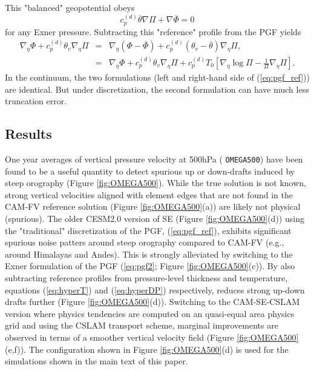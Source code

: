 \documentclass[draft]{agujournal2019}
\begin{document}
This "balanced" geopotential obeys
\begin{equation}
    c_p^{(d)}\overline{\theta}\nabla \Pi+\nabla \overline{\Phi}=0 
\end{equation}
for any Exner pressure. Subtracting this "reference" profile from the PGF yields
\begin{eqnarray}
    \nabla_{\eta }\Phi+c_p^{(d)}\theta_v\nabla_{\eta }\Pi&=& \nabla_{\eta }\left(\Phi-\overline{\Phi}\right)+c_p^{(d)}\left(\theta_v-\overline{\theta}\right)\nabla_{\eta }\Pi,\nonumber \\
    &=& \nabla_{\eta }\Phi+c_p^{(d)}\theta_v\nabla_{\eta }\Pi+c_p^{(d)}T_0\left[ \nabla_\eta \log \Pi -\frac{1}{\Pi}\nabla_\eta \Pi\right].\label{eq:pgf_ref}
\end{eqnarray}
In the continuum, the two formulations (left and right-hand side of (\ref{eq:pgf_ref})) are identical. But under discretization, the second formulation can have much less truncation error. 

\subsection{Results}
One year averages of vertical pressure velocity at 500hPa ( {\tt OMEGA500}) have been found to be a useful quantity to detect spurious up or down-drafts induced by steep orography (Figure \ref{fig:OMEGA500}). While the true solution is not known, strong vertical velocities aligned with element edges that are not found in the CAM-FV reference solution (Figure \ref{fig:OMEGA500}(a)) are likely not physical (spurious). The older CESM2.0 version of SE (Figure \ref{fig:OMEGA500}(d)) using the "traditional" discretization of the PGF, (\ref{eq:pgf_ref}), exhibits significant spurious noise patters around steep orography compared to CAM-FV (e.g., around Himalayas and Andes). This is strongly alleviated by switching to the Exner formulation of the PGF (\ref{eq:pgf2}; Figure \ref{fig:OMEGA500}(c)). By also subtracting reference profiles from pressure-level thickness and temperature, equations (\ref{eq:hyperT}) and (\ref{eq:hyperDP}) respectively, reduces strong up-down drafts further (Figure \ref{fig:OMEGA500}(d)). Switching to the CAM-SE-CSLAM version where physics tendencies are computed on an quasi-equal area physics grid and using the CSLAM transport scheme, marginal improvements are observed in terms of a smoother vertical velocity field (Figure \ref{fig:OMEGA500}(e,f)). The configuration shown in Figure \ref{fig:OMEGA500}(d) is used for the simulations shown in the main text of this paper.
\end{document}
